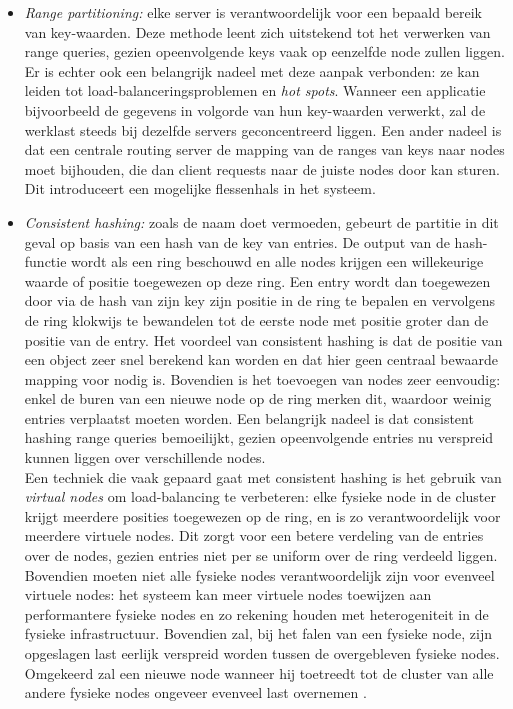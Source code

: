 \begin{itemize}
\item \textit{Range partitioning:} elke server is verantwoordelijk voor een bepaald bereik van key-waarden. Deze methode leent zich uitstekend tot het verwerken van range queries, gezien opeenvolgende keys vaak op eenzelfde node zullen liggen. Er is echter ook een belangrijk nadeel met deze aanpak verbonden: ze kan leiden tot load-balanceringsproblemen en \textit{hot spots}. Wanneer een applicatie bijvoorbeeld de gegevens in volgorde van hun key-waarden verwerkt, zal de werklast steeds bij dezelfde servers geconcentreerd liggen. Een ander nadeel is dat een centrale routing server de mapping van de ranges van keys naar nodes moet bijhouden, die dan client requests naar de juiste nodes door kan sturen. Dit introduceert een mogelijke flessenhals in het systeem.
\item \textit{Consistent hashing:} zoals de naam doet vermoeden, gebeurt de partitie in dit geval op basis van een hash van de key van entries. De output van de hash-functie wordt als een ring beschouwd en alle nodes krijgen een willekeurige waarde of positie toegewezen op deze ring. Een entry wordt dan toegewezen door via de hash van zijn key zijn positie in de ring te bepalen en vervolgens de ring klokwijs te bewandelen tot de eerste node met positie groter dan de positie van de entry. Het voordeel van consistent hashing is dat de positie van een object zeer snel berekend kan worden en dat hier geen centraal bewaarde mapping voor nodig is. Bovendien is het toevoegen van nodes zeer eenvoudig: enkel de buren van een nieuwe node op de ring merken dit, waardoor weinig entries verplaatst moeten worden. Een belangrijk nadeel is dat consistent hashing range queries bemoeilijkt, gezien opeenvolgende entries nu verspreid kunnen liggen over verschillende nodes.\\
Een techniek die vaak gepaard gaat met consistent hashing is het gebruik van \textit{virtual nodes} om load-balancing te verbeteren: elke fysieke node in de cluster krijgt meerdere posities toegewezen op de ring, en is zo verantwoordelijk voor meerdere virtuele nodes. Dit zorgt voor een betere verdeling van de entries over de nodes, gezien entries niet per se uniform over de ring verdeeld liggen. Bovendien moeten niet alle fysieke nodes verantwoordelijk zijn voor evenveel virtuele nodes: het systeem kan meer virtuele nodes toewijzen aan performantere fysieke nodes en zo rekening houden met heterogeniteit in de fysieke infrastructuur. Bovendien zal, bij het falen van een fysieke node, zijn opgeslagen last eerlijk verspreid worden tussen de overgebleven fysieke nodes. Omgekeerd zal een nieuwe node wanneer hij toetreedt tot de cluster van alle andere fysieke nodes ongeveer evenveel last overnemen  \cite{grolinger2013data}\cite{decandia2007dynamo}.
\end{itemize}  

